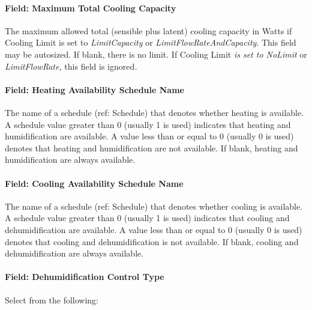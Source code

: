 \paragraph{Field: Maximum Total Cooling Capacity}\label{field-maximum-total-cooling-capacity}

The maximum allowed total (sensible plus latent) cooling capacity in Watts if Cooling Limit is set to \emph{LimitCapacity} or \emph{LimitFlowRateAndCapacity}. This field may be autosized. If blank, there is no limit. If Cooling Limit \emph{is set to NoLimit} or \emph{LimitFlowRate,} this field is ignored\emph{.}

\paragraph{Field: Heating Availability Schedule Name}\label{field-heating-availability-schedule-name-000}

The name of a schedule (ref: Schedule) that denotes whether heating is available. A schedule value greater than 0 (usually 1 is used) indicates that heating and humidification are available. A value less than or equal to 0 (usually 0 is used) denotes that heating and humidification are not available. If blank, heating and humidification are always available.

\paragraph{Field: Cooling Availability Schedule Name}\label{field-cooling-availability-schedule-name-000}

The name of a schedule (ref: Schedule) that denotes whether cooling is available. A schedule value greater than 0 (usually 1 is used) indicates that cooling and dehumidification are available. A value less than or equal to 0 (usually 0 is used) denotes that cooling and dehumidification is not available. If blank, cooling and dehumidification are always available.

\paragraph{Field: Dehumidification Control Type}\label{field-dehumidification-control-type-000}

Select from the following:

